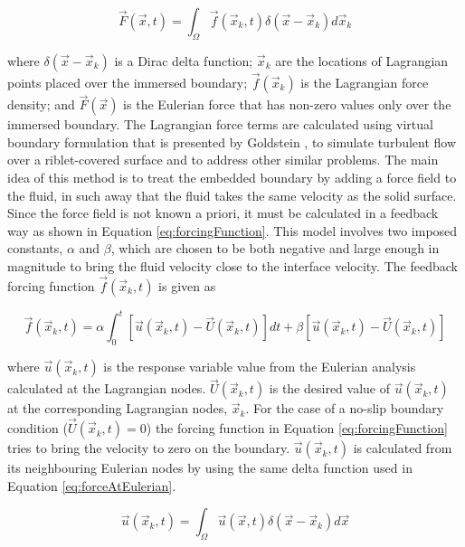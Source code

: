 \documentclass[12pt]{aiaa-pretty}
\begin{document}
%
\begin{equation}\label{eq:forceAtEulerian}
	\vec{F}(\vec{x}, t) = \int_\Omega \vec{f} (\vec{x}_k, t) \delta(\vec{x} - \vec{x}_k) d\vec{x}_k
\end{equation}
%

where $\delta(\vec{x} - \vec{x}_k)$ is a Dirac delta function; $\vec{x}_k$ are the locations of Lagrangian points placed over the immersed boundary; $\vec{f}(\vec{x}_k)$ is the Lagrangian force density; and $\vec{F}(\vec{x})$ is the Eulerian force that has non-zero values only over the immersed boundary. The Lagrangian force terms are calculated using virtual boundary formulation that is presented by Goldstein \cite{goldstein1993modeling}, to simulate turbulent flow over a riblet-covered surface and to address other similar problems. The main idea of this method is to treat the embedded boundary by adding a force field to the fluid, in such away that the fluid takes the same velocity as the solid surface. Since the force field is not known a priori, it must be calculated in a feedback way as shown in Equation \eqref{eq:forcingFunction}. This model involves two imposed constants, $\alpha$ and $\beta$, which are chosen to be both negative and large enough in magnitude to bring the fluid velocity close to the interface velocity. The feedback forcing function $\vec{f}(\vec{x}_k, t)$ is given as

%
\begin{equation}\label{eq:forcingFunction}
	\vec{f}\left( \vec{x}_k, t \right) = 
	\alpha \int_0^t \left[ \vec{u}\left( \vec{x}_k, t \right) - \vec{U}\left( \vec{x}_k, t \right) \right]dt + 
	\beta \left[ \vec{u}\left( \vec{x}_k, t \right) - \vec{U}\left( \vec{x}_k, t \right) \right]
\end{equation}
%

where $\vec{u}\left( \vec{x}_k, t \right)$ is the response variable value from the Eulerian analysis calculated at the Lagrangian nodes. $\vec{U}\left( \vec{x}_k, t \right)$ is the desired value of $\vec{u}\left( \vec{x}_k, t \right)$ at the corresponding Lagrangian nodes, $\vec{x}_k$. For the case of a no-slip boundary condition ($\vec{U}\left( \vec{x}_k, t \right) = 0 $) the forcing function in Equation \eqref{eq:forcingFunction} tries to bring the velocity to zero on the boundary. $\vec{u}\left( \vec{x}_k, t \right)$ is calculated from its neighbouring Eulerian nodes by using the same delta function used in Equation \eqref{eq:forceAtEulerian}.

%
\begin{equation}\label{eq:velocityAtLagrangian}
	\vec{u}(\vec{x}_k, t) = \int_\Omega \vec{u} (\vec{x}, t) \delta(\vec{x} - \vec{x}_k) d\vec{x}
\end{equation}
%
\end{document}
